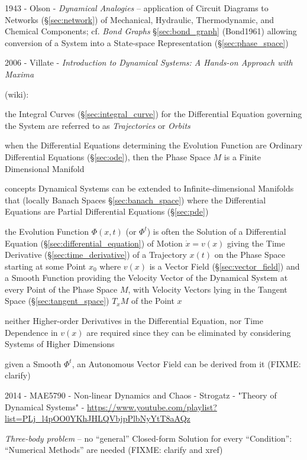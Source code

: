 1943 - Olson - \emph{Dynamical Analogies} -- application of Circuit Diagrams to
Networks (\S\ref{sec:network}) of Mechanical, Hydraulic, Thermodynamic, and
Chemical Components; cf. \emph{Bond Graphs} \S\ref{sec:bond_graph} (Bond1961)
allowing conversion of a System into a State-space Representation
(\S\ref{sec:phase_space})

2006 - Villate - \emph{Introduction to Dynamical Systems: A Hands-on Approach
  with Maxima}

(wiki):

the Integral Curves (\S\ref{sec:integral_curve}) for the Differential Equation
governing the System are referred to as \emph{Trajectories} or \emph{Orbits}

when the Differential Equations determining the Evolution Function are Ordinary
Differential Equations (\S\ref{sec:ode}), then the Phase Space $M$ is a Finite
Dimensional Manifold

concepts Dynamical Systems can be extended to Infinite-dimensional Manifolds
that (locally Banach Spaces \S\ref{sec:banach_space}) where the Differential
Equations are Partial Differential Equations (\S\ref{sec:pde})

the Evolution Function $\Phi(x,t)$ (or $\Phi^t$) is often the Solution of a
Differential Equation (\S\ref{sec:differential_equation}) of Motion $\dot{x} =
v(x)$ giving the Time Derivative (\S\ref{sec:time_derivative}) of a Trajectory
$x(t)$ on the Phase Space starting at some Point $x_0$ where $v(x)$ is a Vector
Field (\S\ref{sec:vector_field}) and a Smooth Function providing the Velocity
Vector of the Dynamical System at every Point of the Phase Space $M$, with
Velocity Vectors lying in the Tangent Space (\S\ref{sec:tangent_space}) $T_xM$
of the Point $x$

neither Higher-order Derivatives in the Differential Equation, nor Time
Dependence in $v(x)$ are required since they can be eliminated by considering
Systems of Higher Dimensions

given a Smooth $\Phi^t$, an Autonomous Vector Field can be derived from it
(FIXME: clarify)

\asterism

2014 - MAE5790 - Non-linear Dynamics and Chaos - Strogatz - "Theory of
Dynamical Systems" -
\url{https://www.youtube.com/playlist?list=PLj_l4pOO0YKhJHLQVbjpPlbNyYtT8aAQz}

\emph{Three-body problem} -- no ``general'' Closed-form Solution for every
``Condition'': ``Numerical Methods'' are needed
(FIXME: clarify and xref)

